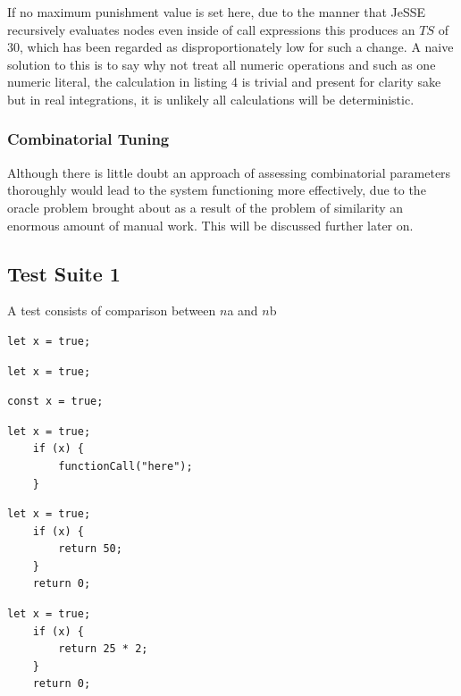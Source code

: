 \documentclass[jou,apacite]{apa6}
\begin{document}
If no maximum punishment value is set here, due to the manner that JeSSE recursively evaluates nodes even inside of call expressions this produces an $TS$ of 30, which has been regarded as disproportionately low for such a change. A naive solution to this is to say why not treat all numeric operations and such as one numeric literal, the calculation in listing 4 is trivial and present for clarity sake but in real integrations, it is unlikely all calculations will be deterministic.

\subsubsection{Combinatorial Tuning}
Although there is little doubt an approach of assessing combinatorial parameters thoroughly  would lead to the system functioning more effectively, due to the oracle problem brought about as a result of the problem of similarity an enormous amount of manual work. This will be discussed further later on.

\subsection{Test Suite 1}
A test consists of comparison between $n$a and $n$b
\begin{lstlisting}[caption=Comparison 1a \& 1b - Identical]
	let x = true;
\end{lstlisting}

\begin{lstlisting}[caption=Comparison 2a - Let against const]
	let x = true;
\end{lstlisting}
\begin{lstlisting}[caption=Comparison 2b - Let against const]
	const x = true;
\end{lstlisting}

\begin{lstlisting}[caption=Comparison 3a \& 3b - Identical extended]
	let x = true;
	if (x) {
		functionCall("here");
	}
\end{lstlisting}

\begin{lstlisting}[caption=Comparison 4a - Effect of numeric literal vs numberic expression]
	let x = true;
	if (x) {
		return 50;
	}
	return 0;
\end{lstlisting}

\begin{lstlisting}[caption=Comparison 4b - Effect of numeric literal vs numberic expression]
	let x = true;
	if (x) {
		return 25 * 2;
	}
	return 0;
\end{lstlisting}
\end{document}
